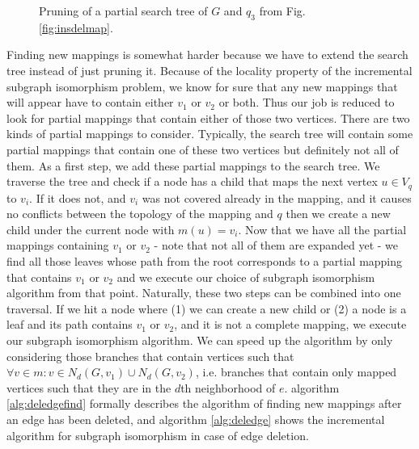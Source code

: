 \begin{figure}[h]
    \centering    
    \caption{Pruning of a partial search tree of $G$ and $q_3$ from Fig. \ref{fig:insdelmap}.}
    \label{fig:pruneex}
\end{figure}

Finding new mappings is somewhat harder because we have to extend the search tree instead
of just pruning it. Because of the locality property of the incremental subgraph isomorphism
problem, we know for sure that any new mappings that will appear have to contain either $v_1$
or $v_2$ or both. Thus our job is reduced to look for partial mappings that contain either of 
those two vertices. There are two kinds of partial mappings to consider. Typically, the search
tree will contain some partial mappings that contain one of these two vertices but definitely
not all of them. As a first step, we add these partial mappings to the search tree. We traverse 
the tree and check if a node has a child that maps the next vertex $u \in V_q$ to $v_i$. If it does
not, and $v_i$ was not covered already in the mapping, and it causes no conflicts between the 
topology of the mapping and $q$ then we create a new child under the current node with 
$m(u) = v_i$. Now that we have all the partial mappings containing $v_1$ or $v_2$ - note that not 
all of them are expanded yet - we find all those leaves whose path from the root corresponds to a 
partial mapping that contains $v_1$ or $v_2$ and we execute our choice of subgraph isomorphism 
algorithm from that point. Naturally, these two steps can be combined into one traversal. If we 
hit a node where (1) we can create a new child or (2) a node is a leaf and its path contains $v_1$ 
or $v_2$, and it is not a complete mapping, we execute our subgraph isomorphism algorithm. We
can speed up the algorithm by only considering those branches that contain vertices such that
$\forall v \in m: v \in N_d(G, v_1) \cup N_d(G, v_2)$, i.e. branches that contain only mapped 
vertices such that they are in the $d$th neighborhood of $e$. algorithm \ref{alg:deledgefind}
formally describes the algorithm of finding new mappings after an edge has been deleted, and
algorithm \ref{alg:deledge} shows the incremental algorithm for subgraph isomorphism in case of edge 
deletion.

